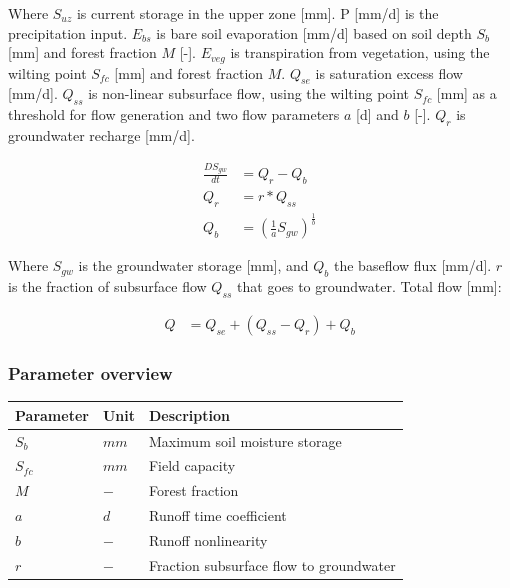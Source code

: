 Where $S_{uz}$ is current storage in the upper zone [mm]. 
P [mm/d] is the precipitation input. 
$E_{bs}$ is bare soil evaporation [mm/d] based on soil depth 
$S_b$ [mm] and forest fraction $M$ [-]. $E_{veg}$ is transpiration from vegetation, using the wilting point $S_{fc}$ [mm] and forest fraction $M$. $Q_{se}$ is saturation excess flow [mm/d]. 
$Q_{ss}$ is non-linear subsurface flow, using the wilting point $S_{fc}$ [mm] as a threshold for flow generation and two flow parameters $a$ [d] and $b$ [-]. $Q_r$ is groundwater recharge [mm/d].

\begin{align}
	\frac{DS_{gw}}{dt} &= Q_r-Q_b\\
	Q_r &= r*Q_{ss}\\
	Q_b &= \left(\frac{1}{a}S_{gw}\right)^{\frac{1}{b}}
\end{align}	

Where $S_{gw}$ is the groundwater storage [mm], and $Q_b$ the baseflow flux [mm/d]. $r$ is the fraction of subsurface flow $Q_{ss}$ that goes to groundwater. Total flow [mm]:

\begin{align}
	Q &= Q_{se} + (Q_{ss} - Q_r) + Q_b
\end{align}

\subsubsection{Parameter overview}
\begin{table}[htbp]
  \centering
    \begin{tabular}{lll}
    \toprule
    Parameter & Unit  & Description \\
    \midrule
    $S_b$ & $mm$  & Maximum soil moisture storage \\
    $S_{fc}$ & $mm$  & Field capacity \\
    $M$   & $-$   & Forest fraction \\
    $a$   & $d$   & Runoff time coefficient \\
    $b$   & $-$   & Runoff nonlinearity \\
    $r$   & $-$   & Fraction subsurface flow to groundwater \\
    \bottomrule
    \end{tabular}%
  \label{tab:addlabel}%
\end{table}%


